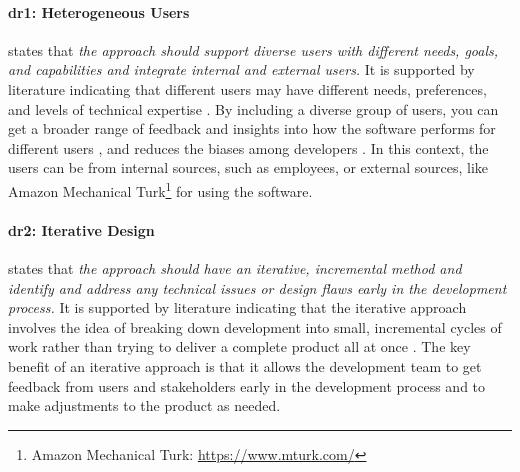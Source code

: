 
\paragraph{\ac{dr}1: Heterogeneous Users} states that \textit{the approach should support diverse users with different needs, goals, and capabilities and integrate internal and external users.} 
It is supported by literature indicating that different users may have different needs, preferences, and levels of technical expertise \cite{misc:lean:steve}.
By including a diverse group of users, you can get a broader range of feedback and insights into how the software performs for different users \cite{article:prototyping:weichbroth}, and reduces the biases among developers \cite{misc:lean:burmeister}.
In this context, the users can be from internal sources, such as employees, or external sources, like Amazon Mechanical Turk\footnote{Amazon Mechanical Turk: \url{https://www.mturk.com/}} for using the software.

\paragraph{\ac{dr}2: Iterative Design} states that \textit{the approach should have an iterative, incremental method and identify and address any technical issues or design flaws early in the development process.} 
It is supported by literature indicating that the iterative approach involves the idea of breaking down development into small, incremental cycles of work rather than trying to deliver a complete product all at once \cite{misc:lean:tutorial}.
The key benefit of an iterative approach is that it allows the development team to get feedback from users and stakeholders early in the development process and to make adjustments \cite{article:experiments:lindgren} to the product as needed.

